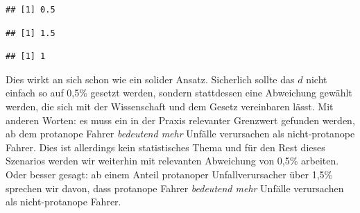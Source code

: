 \documentclass[
]{article}
\newenvironment{Shaded}{\begin{snugshade}}{\end{snugshade}}
\newcommand{\CommentTok}[1]{\textcolor[rgb]{0.56,0.35,0.01}{\textit{#1}}}
\newcommand{\DecValTok}[1]{\textcolor[rgb]{0.00,0.00,0.81}{#1}}
\newcommand{\FloatTok}[1]{\textcolor[rgb]{0.00,0.00,0.81}{#1}}
\newcommand{\KeywordTok}[1]{\textcolor[rgb]{0.13,0.29,0.53}{\textbf{#1}}}
\newcommand{\NormalTok}[1]{#1}
\newcommand{\OperatorTok}[1]{\textcolor[rgb]{0.81,0.36,0.00}{\textbf{#1}}}
\newcommand{\StringTok}[1]{\textcolor[rgb]{0.31,0.60,0.02}{#1}}
\begin{document}
\begin{Shaded}
\end{Shaded}

\begin{verbatim}
## [1] 0.5
\end{verbatim}

\begin{Shaded}
\end{Shaded}

\begin{verbatim}
## [1] 1.5
\end{verbatim}

\begin{Shaded}
\end{Shaded}

\begin{verbatim}
## [1] 1
\end{verbatim}

Dies wirkt an sich schon wie ein solider Ansatz. Sicherlich sollte das
\(d\) nicht einfach so auf 0,5\% gesetzt werden, sondern stattdessen
eine Abweichung gewählt werden, die sich mit der Wissenschaft und dem
Gesetz vereinbaren lässt. Mit anderen Worten: es muss ein in der Praxis
relevanter Grenzwert gefunden werden, ab dem protanope Fahrer
\emph{bedeutend mehr} Unfälle verursachen als nicht-protanope Fahrer.
Dies ist allerdings kein statistisches Thema und für den Rest dieses
Szenarios werden wir weiterhin mit relevanten Abweichung von 0,5\%
arbeiten. Oder besser gesagt: ab einem Anteil protanoper
Unfallverursacher über 1,5\% sprechen wir davon, dass protanope Fahrer
\emph{bedeutend mehr} Unfälle verursachen als nicht-protanope Fahrer.
\end{document}
